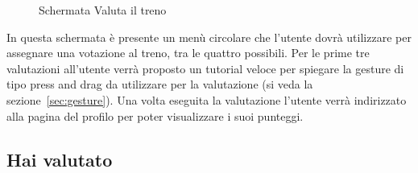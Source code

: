 \begin{figure}[H]
    \caption{Schermata Valuta il treno}
    \label{fig:valutaTreno}
\end{figure}

In questa schermata è presente un menù circolare che l'utente dovrà utilizzare per assegnare una votazione al treno, tra le quattro possibili.
Per le prime tre valutazioni all'utente verrà proposto un tutorial veloce per spiegare la gesture di tipo press and drag da utilizzare per la valutazione (si veda la sezione~\vref{sec:gesture}). Una volta eseguita la valutazione l'utente verrà indirizzato alla pagina del profilo per poter visualizzare i suoi punteggi.

\subsection{Hai valutato}


